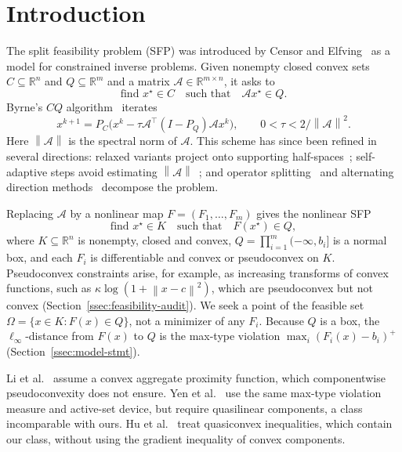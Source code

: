 \documentclass[]{interact}
\theoremstyle{plain}
\theoremstyle{definition}
\theoremstyle{remark}
\newcommand{\R}{\mathbb{R}}
\newcommand{\norm}[1]{\left\lVert #1 \right\rVert}
\begin{document}
\section{Introduction}\label{sec:intro}

The split feasibility problem (SFP) was introduced by Censor and Elfving~\citep{censor1994} as a model for constrained inverse problems. Given nonempty closed convex sets $C\subseteq\R^n$ and $Q\subseteq\R^m$ and a matrix $\mathcal A\in\R^{m\times n}$, it asks to
\begin{equation}\label{eq:sfp-intro}
\text{find }x^\star\in C\quad\text{such that}\quad\mathcal A x^\star\in Q.
\end{equation}
Byrne's $CQ$ algorithm~\citep{byrne2002} iterates
\begin{equation}\label{eq:cq-intro}
x^{k+1}=P_C\bigl(x^k-\tau\mathcal A^\top(I-P_Q)\mathcal A x^k\bigr),
\qquad 0<\tau<2/\norm{\mathcal A}^2.
\end{equation}
Here $\norm{\mathcal A}$ is the spectral norm of $\mathcal A$. This scheme has since been refined in several directions: relaxed variants project onto supporting half-spaces~\citep{yang2004}; self-adaptive steps avoid estimating $\norm{\mathcal A}$~\citep{zhang2009adaptive,zhao2011adaptive,lopez2012}; and operator splitting~\citep{zhang2012simultaneous} and alternating direction methods~\citep{yang2014alternating} decompose the problem.

Replacing $\mathcal A$ by a nonlinear map $F=(F_1,\dots,F_m)$ gives the nonlinear SFP~\citep{li2013nsfp,yen2019}
\begin{equation}\label{eq:nsfp-intro}
\text{find }x^\star\in K\quad\text{such that}\quad F(x^\star)\in Q,
\end{equation}
where $K\subseteq\R^n$ is nonempty, closed and convex, $Q=\prod_{i=1}^m(-\infty,b_i]$ is a normal box, and each $F_i$ is differentiable and convex or pseudoconvex on $K$. Pseudoconvex constraints arise, for example, as increasing transforms of convex functions, such as $\kappa\log(1+\norm{x-c}^2)$, which are pseudoconvex but not convex (Section~\ref{ssec:feasibility-audit}). We seek a point of the feasible set $\Omega=\{x\in K:F(x)\in Q\}$, not a minimizer of any $F_i$. Because $Q$ is a box, the $\ell_\infty$-distance from $F(x)$ to $Q$ is the max-type violation $\max_i(F_i(x)-b_i)^+$ (Section~\ref{ssec:model-stmt}).

Li et al.~\citep{li2013nsfp} assume a convex aggregate proximity function, which componentwise pseudoconvexity does not ensure. Yen et al.~\citep{yen2019} use the same max-type violation measure and active-set device, but require quasilinear components, a class incomparable with ours. Hu et al.~\citep{hu2022quasi} treat quasiconvex inequalities, which contain our class, without using the gradient inequality of convex components.
\end{document}
